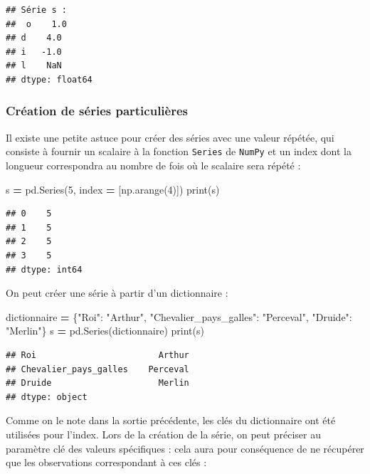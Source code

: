 \documentclass[12pt,]{book}
\newenvironment{Shaded}{\begin{snugshade}}{\end{snugshade}}
\newcommand{\DecValTok}[1]{\textcolor[rgb]{0.00,0.00,0.81}{#1}}
\newcommand{\StringTok}[1]{\textcolor[rgb]{0.31,0.60,0.02}{#1}}
\newcommand{\OperatorTok}[1]{\textcolor[rgb]{0.81,0.36,0.00}{\textbf{#1}}}
\newcommand{\BuiltInTok}[1]{#1}
\newcommand{\NormalTok}[1]{#1}
\numberwithin{equation}{section}
\numberwithin{countremarque}{section}
\begin{document}
\begin{lstlisting}
## Série s : 
##  o    1.0
## d    4.0
## i   -1.0
## l    NaN
## dtype: float64
\end{lstlisting}

\subsubsection{Création de séries
particulières}\label{creation-de-series-particulieres}

Il existe une petite astuce pour créer des séries avec une valeur
répétée, qui consiste à fournir un scalaire à la fonction
\texttt{Series} de \texttt{NumPy} et un index dont la longueur
correspondra au nombre de fois où le scalaire sera répété :

\begin{Shaded}
\begin{Highlighting}[]
\NormalTok{s }\OperatorTok{=}\NormalTok{ pd.Series(}\DecValTok{5}\NormalTok{, index }\OperatorTok{=}\NormalTok{ [np.arange(}\DecValTok{4}\NormalTok{)])}
\BuiltInTok{print}\NormalTok{(s)}
\end{Highlighting}
\end{Shaded}

\begin{lstlisting}
## 0    5
## 1    5
## 2    5
## 3    5
## dtype: int64
\end{lstlisting}

On peut créer une série à partir d'un dictionnaire :

\begin{Shaded}
\begin{Highlighting}[]
\NormalTok{dictionnaire }\OperatorTok{=}\NormalTok{ \{}\StringTok{"Roi"}\NormalTok{: }\StringTok{"Arthur"}\NormalTok{,}
                \StringTok{"Chevalier_pays_galles"}\NormalTok{: }\StringTok{"Perceval"}\NormalTok{,}
                \StringTok{"Druide"}\NormalTok{: }\StringTok{"Merlin"}\NormalTok{\}}
\NormalTok{s }\OperatorTok{=}\NormalTok{ pd.Series(dictionnaire)}
\BuiltInTok{print}\NormalTok{(s)}
\end{Highlighting}
\end{Shaded}

\begin{lstlisting}
## Roi                        Arthur
## Chevalier_pays_galles    Perceval
## Druide                     Merlin
## dtype: object
\end{lstlisting}

Comme on le note dans la sortie précédente, les clés du dictionnaire ont
été utilisées pour l'index. Lors de la création de la série, on peut
préciser au paramètre clé des valeurs spécifiques : cela aura pour
conséquence de ne récupérer que les observations correspondant à ces
clés :
\end{document}
